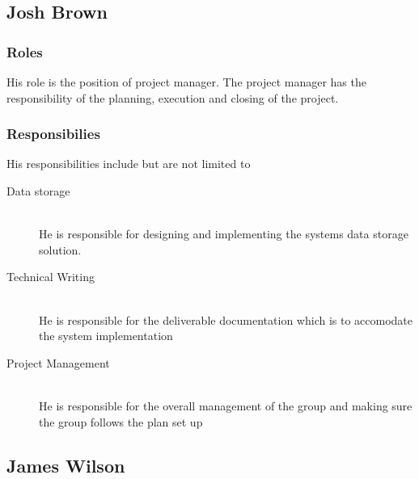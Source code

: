 \subsection{Josh Brown}

\subsubsection{Roles}

	His role is the position of project manager. The project manager has the responsibility of the planning, execution and closing of the project.


\subsubsection{Responsibilies}

	His responsibilities include but are not limited to

	\begin{description}
		\item[Data storage] \hfill \\ He is responsible for designing and implementing the systems data storage solution.
		\item[Technical Writing] \hfill \\ He is responsible for the deliverable documentation which is to accomodate the system implementation
		\item[Project Management] \hfill \\ He is responsible for the overall management of the group and making sure the group follows the plan set up
	\end{description}


\subsection{James Wilson}

